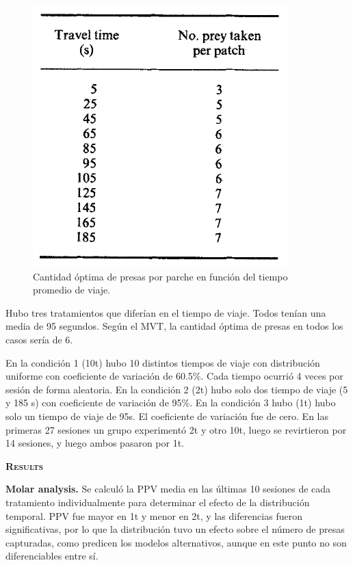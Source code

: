 \documentclass[a4paper,12pt]{article}
\begin{document}
\begin{figure}[ht]
        \begin{center}
                \includegraphics[scale=0.7]{Kacelnik1992(1).png}
                \caption{Cantidad óptima de presas por parche en función del tiempo promedio de viaje.}
        \end{center}
\end{figure}

Hubo tres tratamientos que diferían en el tiempo de viaje. Todos tenían una media de 95 segundos. Según el MVT, la cantidad óptima de presas en todos los casos sería de 6.

En la condición 1 (10t) hubo 10 distintos tiempos de viaje con distribución uniforme con coeficiente de variación de 60.5\%. Cada tiempo ocurrió 4 veces por sesión de forma aleatoria. En la condición 2 (2t) hubo solo dos tiempo de viaje (5 y 185 s) con coeficiente de variación de 95\%. En la condición 3 hubo  (1t) hubo solo un tiempo de viaje de 95s. El coeficiente de variación fue de cero. En las primeras 27 sesiones un grupo experimentó 2t y otro 10t, luego se revirtieron por 14 sesiones, y luego ambos pasaron por 1t.

{\scshape\bfseries Results}

{\bfseries Molar analysis.} Se calculó la PPV media en las últimas 10 sesiones de cada tratamiento individualmente para determinar el efecto de la distribución temporal. PPV fue mayor en 1t y menor en 2t, y las diferencias fueron significativas, por lo que la distribución tuvo un efecto sobre el número de presas capturadas, como predicen los modelos alternativos, aunque en este punto no son diferenciables entre sí. 
\end{document}
